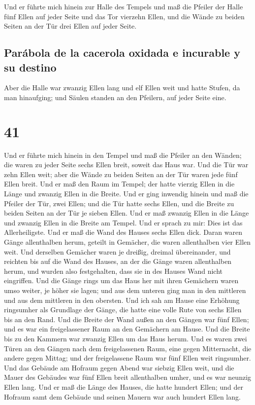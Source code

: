  Und er führte mich hinein zur Halle des Tempels und maß
die Pfeiler der Halle fünf Ellen auf jeder Seite und das Tor vierzehn
Ellen, und die Wände zu beiden Seiten an der Tür drei Ellen auf jeder
Seite.

\hypertarget{paruxe1bola-de-la-cacerola-oxidada-e-incurable-y-su-destino}{%
\subsection{Parábola de la cacerola oxidada e incurable y su
destino}\label{paruxe1bola-de-la-cacerola-oxidada-e-incurable-y-su-destino}}

 Aber die Halle war zwanzig Ellen lang und elf Ellen weit
und hatte Stufen, da man hinaufging; und Säulen standen an den Pfeilern,
auf jeder Seite eine.

\hypertarget{section-40}{%
\section{41}\label{section-40}}

 Und er führte mich hinein in den Tempel und maß die
Pfeiler an den Wänden; die waren zu jeder Seite sechs Ellen breit,
soweit das Haus war.  Und die Tür war zehn Ellen weit;
aber die Wände zu beiden Seiten an der Tür waren jede fünf Ellen breit.
Und er maß den Raum im Tempel; der hatte vierzig Ellen in die Länge und
zwanzig Ellen in die Breite.  Und er ging inwendig hinein
und maß die Pfeiler der Tür, zwei Ellen; und die Tür hatte sechs Ellen,
und die Breite zu beiden Seiten an der Tür je sieben Ellen.
 Und er maß zwanzig Ellen in die Länge und zwanzig Ellen
in die Breite am Tempel. Und er sprach zu mir: Dies ist das
Allerheiligste.  Und er maß die Wand des Hauses sechs
Ellen dick. Daran waren Gänge allenthalben herum, geteilt in Gemächer,
die waren allenthalben vier Ellen weit.  Und derselben
Gemächer waren je dreißig, dreimal übereinander, und reichten bis auf
die Wand des Hauses, an der die Gänge waren allenthalben herum, und
wurden also festgehalten, dass sie in des Hauses Wand nicht eingriffen.
 Und die Gänge rings um das Haus her mit ihren Gemächern
waren umso weiter, je höher sie lagen; und aus dem unteren ging man in
den mittleren und aus dem mittleren in den obersten.  Und
ich sah am Hause eine Erhöhung ringsumher als Grundlage der Gänge, die
hatte eine volle Rute von sechs Ellen bis an den Rand. 
Und die Breite der Wand außen an den Gängen war fünf Ellen; und es war
ein freigelassener Raum an den Gemächern am Hause.  Und
die Breite bis zu den Kammern war zwanzig Ellen um das Haus herum.
 Und es waren zwei Türen an den Gängen nach dem
freigelassenen Raum, eine gegen Mitternacht, die andere gegen Mittag;
und der freigelassene Raum war fünf Ellen weit ringsumher.
 Und das Gebäude am Hofraum gegen Abend war siebzig Ellen
weit, und die Mauer des Gebäudes war fünf Ellen breit allenthalben
umher, und es war neunzig Ellen lang.  Und er maß die
Länge des Hauses, die hatte hundert Ellen; und der Hofraum samt dem
Gebäude und seinen Mauern war auch hundert Ellen lang.


